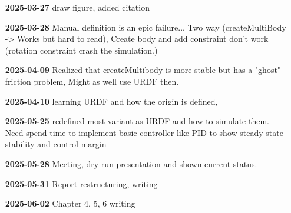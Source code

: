 \begin{itemize}[leftmargin=1.5cm,label={}]
    \item[\textbf{2025-03-27}] draw figure, added citation

    \item[\textbf{2025-03-28}] Manual definition is an epic failure... Two way (createMultiBody -> Works but hard to read), Create body and add constraint don't work (rotation constraint crash the simulation.)

    \item[\textbf{2025-04-09}] Realized that createMultibody is more stable but has a "ghost" friction problem, Might as well use URDF then.

    \item[\textbf{2025-04-10}] learning URDF and how the origin is defined, 

    \item[\textbf{2025-05-25}] redefined most variant as URDF and how to simulate them. Need spend time to implement basic controller like PID to show steady state stability and control margin

    \item[\textbf{2025-05-28}] Meeting, dry run presentation  and shown current status.

    \item[\textbf{2025-05-31}] Report restructuring, writing

    \item[\textbf{2025-06-02}] Chapter 4, 5, 6 writing
\end{itemize}
